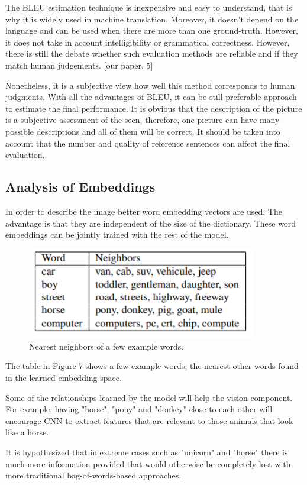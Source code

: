 \documentclass[a4paper,UKenglish,cleveref, autoref, thm-restate]{lipics-v2021}
\begin{document}
The BLEU estimation technique is inexpensive and easy to understand, that is why it is widely used in machine translation. Moreover, it doesn't depend on the language and can be used when there are more than one ground-truth. However, it does not take in account intelligibility or grammatical correctness. However, there is still the debate whether such evaluation methods are reliable and if they match human judgements. [our paper, 5]

Nonetheless, it is a subjective view how well this method corresponds to human judgments. With all the advantages of BLEU, it can be still preferable approach to estimate the final performance.
It is obvious that the description of the picture is a subjective assessment of the seen, therefore, one picture can have many possible descriptions and all of them will be correct. It should be taken into account that the number and quality of reference sentences can affect the final evaluation.

\subsection{Analysis of Embeddings}
In order to describe the image better word embedding vectors are used. The advantage is that they are independent of the size of the dictionary. These word embeddings can be jointly trained with the rest of the model.
\begin{figure}[ht]
    \centering
    \includegraphics[width=10cm]{images/Word_Embeddings.png}
    \caption{Nearest neighbors of a few example words.}
    \label{fig:}
\end{figure}

The table in Figure 7 shows a few example words, the nearest other words found in the learned embedding space.

Some of the relationships learned by the model will help the vision component. For example, having "horse", "pony" and "donkey" close to each other will encourage CNN to extract features that are relevant to those animals that look like a horse.

It is hypothesized that in extreme cases such as "unicorn" and "horse" there is much more information provided that would otherwise be completely lost with more traditional bag-of-words-based approaches.
\end{document}
